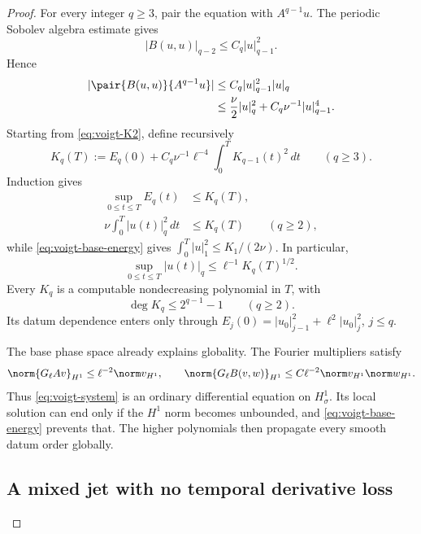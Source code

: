 \begin{proof}
For every integer \(q\ge3\), pair the equation with \(A^{q-1}u\).  The
periodic Sobolev algebra estimate gives
\begin{equation}
 |B(u,u)|_{q-2}\le C_q|u|_{q-1}^2.
 \label{eq:voigt-high-product}
\end{equation}
Hence
\begin{align}
 |\pair{B(u,u)}{A^{q-1}u}|
 &\le C_q|u|_{q-1}^2|u|_q
 \notag\\
 &\le\frac\nu2|u|_q^2+C_q\nu^{-1}|u|_{q-1}^4.
 \label{eq:voigt-high-row-estimate}
\end{align}
Starting from \eqref{eq:voigt-K2}, define recursively
\begin{equation}
 K_q(T):=E_q(0)+C_q\nu^{-1}\ell^{-4}
 \int_0^T K_{q-1}(t)^2\,dt
 \qquad(q\ge3).
 \label{eq:voigt-Kq}
\end{equation}
Induction gives
\begin{align}
 \sup_{0\le t\le T}E_q(t)&\le K_q(T),
 \label{eq:voigt-energy-envelope}\\
 \nu\int_0^T|u(t)|_q^2\,dt&\le K_q(T)
 \qquad(q\ge2),
 \label{eq:voigt-dissipation-envelope}
\end{align}
while \eqref{eq:voigt-base-energy} gives
\(\int_0^T|u|_1^2\le K_1/(2\nu)\).  In particular,
\begin{equation}
 \sup_{0\le t\le T}|u(t)|_q
 \le\ell^{-1}K_q(T)^{1/2}.
 \label{eq:voigt-spatial-bound}
\end{equation}
Every \(K_q\) is a computable nondecreasing polynomial in \(T\), with
\begin{equation}
 \deg K_q\le 2^{q-1}-1\qquad(q\ge2).
 \label{eq:voigt-polynomial-degree}
\end{equation}
Its datum dependence enters only through
\(E_j(0)=|u_0|_{j-1}^2+\ell^2|u_0|_j^2\), \(j\le q\).

The base phase space already explains globality.  The Fourier multipliers
satisfy
\begin{equation}
 \norm{G_\ell Av}_{H^1}\le\ell^{-2}\norm v_{H^1},
 \qquad
 \norm{G_\ell B(v,w)}_{H^1}
 \le C\ell^{-2}\norm v_{H^1}\norm w_{H^1}.
 \label{eq:voigt-H1-vector-field}
\end{equation}
Thus \eqref{eq:voigt-system} is an ordinary differential equation on
\(H^1_\sigma\).  Its local solution can end only if the \(H^1\) norm becomes
unbounded, and \eqref{eq:voigt-base-energy} prevents that.  The higher
polynomials then propagate every smooth datum order globally.

\subsection{A mixed jet with no temporal derivative loss}


\end{proof}

